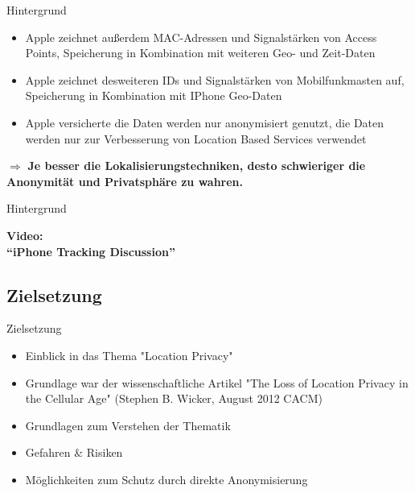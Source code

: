 \begin{frame}{Hintergrund}
\begin{itemize}
  \item Apple zeichnet außerdem MAC-Adressen und Signalstärken von Access Points, Speicherung in Kombination mit weiteren Geo- und Zeit-Daten
  \item Apple zeichnet desweiteren IDs und Signalstärken von Mobilfunkmasten auf, Speicherung in Kombination mit IPhone Geo-Daten
  \item Apple versicherte die Daten werden nur anonymisiert genutzt, die Daten werden nur zur Verbesserung von Location Based Services verwendet
\end{itemize}
$\Rightarrow$ \textbf{Je besser die Lokalisierungstechniken, desto schwieriger die Anonymität und Privatsphäre zu wahren.}
\end{frame}

\begin{frame}{Hintergrund}
\begin{center}
  \huge \textbf{Video:\\\vspace{1cm} ``iPhone Tracking Discussion''}
\end{center}
\end{frame}

\subsection{Zielsetzung}
\begin{frame}{Zielsetzung}
\begin{itemize}
  \item Einblick in das Thema "Location Privacy"
  \item Grundlage war der wissenschaftliche Artikel "The Loss of Location Privacy in the Cellular Age" (Stephen B. Wicker, August 2012 CACM)
  \item Grundlagen zum Verstehen der Thematik
  \item Gefahren \& Risiken
  \item Möglichkeiten zum Schutz durch direkte Anonymisierung
\end{itemize}
\end{frame}

